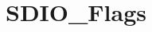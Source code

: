 \hypertarget{group___s_d_i_o___flags}{\section{S\-D\-I\-O\-\_\-\-Flags}
\label{group___s_d_i_o___flags}
}
